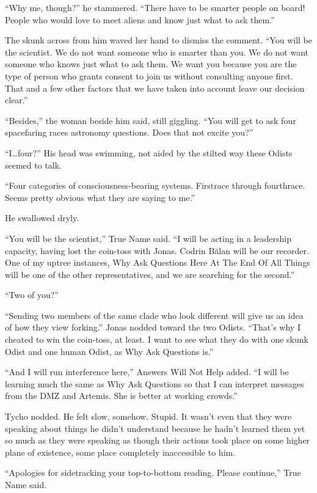``Why me, though?'' he stammered. ``There have to be smarter people on board! People who would love to meet aliens and know just what to ask them.''

The skunk across from him waved her hand to dismiss the comment. ``You will be the scientist. We do not want someone who is smarter than you. We do not want someone who knows just what to ask them. We want you because you are the type of person who grants consent to join us without consulting anyone first. That and a few other factors that we have taken into account leave our decision clear.''

``Besides,'' the woman beside him said, still giggling. ``You will get to ask four spacefaring races astronomy questions. Does that not excite you?''

``I\ldots four?'' His head was swimming, not aided by the stilted way these Odists seemed to talk.

``Four categories of consciousness-bearing systems. Firstrace through fourthrace. Seems pretty obvious what they are saying to me.''

He swallowed dryly.

``You will be the scientist,'' True Name said. ``I will be acting in a leadership capacity, having lost the coin-toss with Jonas. Codrin Bălan will be our recorder. One of my uptree instances, Why Ask Questions Here At The End Of All Things will be one of the other representatives, and we are searching for the second.''

``Two of you?''

``Sending two members of the same clade who look different will give us an idea of how they view forking.'' Jonas nodded toward the two Odists. ``That's why I cheated to win the coin-toss, at least. I want to see what they do with one skunk Odist and one human Odist, as Why Ask Questions is.''

``And I will run interference here,'' Answers Will Not Help added. ``I will be learning much the same as Why Ask Questions so that I can interpret messages from the DMZ and Artemis. She is better at working crowds.''

Tycho nodded. He felt slow, somehow. Stupid. It wasn't even that they were speaking about things he didn't understand because he hadn't learned them yet so much as they were speaking as though their actions took place on some higher plane of existence, some place completely inaccessible to him.

``Apologies for sidetracking your top-to-bottom reading. Please continue,'' True Name said.

